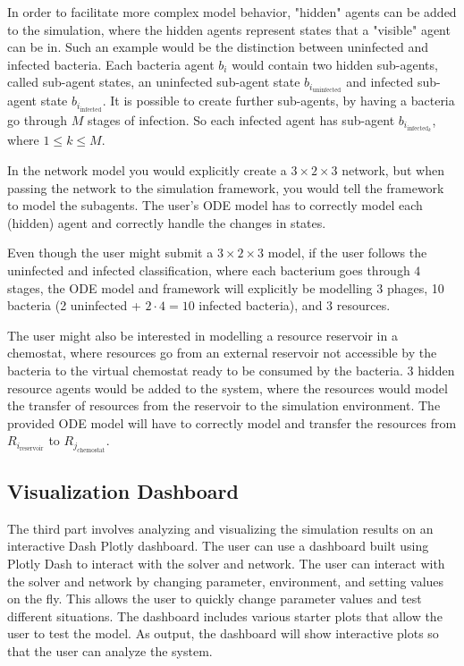 In order to facilitate more complex model behavior, "hidden" agents can be added to the simulation, where the hidden agents represent states that a "visible" agent can be in. 
Such an example would be the distinction between uninfected and infected bacteria. 
Each bacteria agent $b_i$ would contain two hidden sub-agents, called sub-agent states, an uninfected sub-agent state $b_{i_\text{uninfected}}$ and infected sub-agent state $b_{i_\text{infected}}$. 
It is possible to create further sub-agents, by having a bacteria go through $M$ stages of infection. 
So each infected agent has sub-agent $b_{i_{\text{infected}_k}}$, where $1 \leq k \leq M$. 

In the network model you would explicitly create a $3\times 2 \times 3$ network, but when passing the network to the simulation framework, you would tell the framework to model the subagents. 
The user's ODE model has to correctly model each (hidden) agent and correctly handle the changes in states. 

Even though the user might submit a $3 \times 2 \times 3$ model, if the user follows the uninfected and infected classification, where each bacterium goes through $4$ stages, the ODE model and framework will explicitly be modelling 3 phages, 10 bacteria (2 uninfected + $2\cdot 4=10$ infected bacteria), and 3 resources. 

The user might also be interested in modelling a resource reservoir in a chemostat, where resources go from an external reservoir not accessible by the bacteria to the virtual chemostat ready to be consumed by the bacteria. 
3 hidden resource agents would be added to the system, where the resources would model the transfer of resources from the reservoir to the simulation environment. 
The provided ODE model will have to correctly model and transfer the resources from $R_{i_{\text{reservoir}}}$ to $R_{j_{\text{chemostat}}}$. 

\subsection{Visualization Dashboard}
\label{sec:visualization_framework}
The third part involves analyzing and visualizing the simulation results on an interactive Dash Plotly \cite{DashDocumentationUser} dashboard. 
The user can use a dashboard built using Plotly Dash to interact with the solver and network.
The user can interact with the solver and network by changing parameter, environment, and setting values on the fly.
This allows the user to quickly change parameter values and test different situations.
The dashboard includes various starter plots that allow the user to test the model.
As output, the dashboard will show interactive plots so that the user can analyze the system. 


